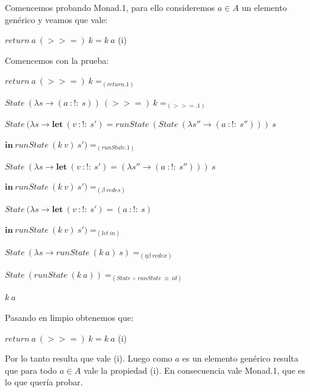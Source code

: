 \begin{flushleft}
\begin{itemize}
  \end{itemize}

Comencemos probando Monad.1, para ello consideremos $a\in A$ un elemento genérico y veamos que vale:

  \begin{center}
    $return\ a\ (>>=)\ k = k\ a$ (i)
  \end{center}

Comencemos con la prueba:\emptyline

  \hspace{5mm} $return\ a\ (>>=)\ k =_{(return.1)}$

  \hspace{5mm} $State\ (\lambda s \rightarrow (a\ :!:\ s))\ (>>=)\ k =_{(>>=.1)}$

  \hspace{5mm} $State\ (\lambda s \rightarrow \textbf{let}\ (v\ :!:\ s') = runState\ (State\ (\lambda s'' \rightarrow (a\ :!:\ s'')))\ s$
    
    \hspace{25.5mm} $\textbf{in}\ runState\ (k\ v)\ s') =_{(runState.1)}$

  \hspace{5mm} $State\ (\lambda s \rightarrow \textbf{let}\ (v\ :!:\ s') = (\lambda s'' \rightarrow (a\ :!:\ s'')))\ s$
    
    \hspace{25.5mm} $\textbf{in}\ runState\ (k\ v)\ s') =_{(\beta\ redes)}$

  \hspace{5mm} $State\ (\lambda s \rightarrow \textbf{let}\ (v\ :!:\ s') = (a\ :!:\ s)$
  
    \hspace{25.5mm} $\textbf{in}\ runState\ (k\ v)\ s') =_{(let\ in)}$

  \hspace{5mm} $State\ (\lambda s \rightarrow runState\ (k\ a)\ s) =_{(\eta\beta\ redex)}$

  \hspace{5mm} $State\ (runState\ (k\ a)) =_{(State\ \circ\ runState\ \equiv\ id)}$

  \hspace{5mm} $k\ a$\emptyline

Pasando en limpio obtenemos que:

  \begin{center}
    $return\ a\ (>>=)\ k = k\ a$ (i)
  \end{center}

Por lo tanto resulta que vale (i). Luego como $a$ es un elemento genérico resulta que para todo $a\in A$ vale la propiedad (i). 
En consecuencia vale Monad.1, que es lo que quería probar.\newpage


\end{flushleft}
